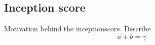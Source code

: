 \documentclass[conference]{IEEEtran}
\begin{document}

\subsection{Inception score}
Motivation behind the inceptionscore. Describe
\begin{equation}
a+b=\gamma\label{eq}
\end{equation}
\end{document}

